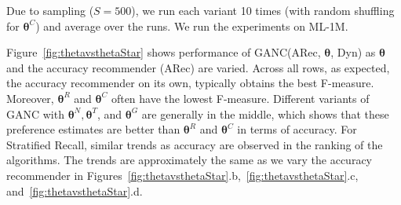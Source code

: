 Due to sampling ($S=500$), we run each variant 10 times (with random shuffling for  $\bm{\theta}^C$) and average over the runs.  We run the experiments on ML-1M.  %

Figure~\ref{fig:thetavsthetaStar} shows performance of GANC(ARec, $\bm{\theta}$, Dyn) as $\bm{\theta}$ and the accuracy recommender (ARec) are varied. Across all rows, as expected, the accuracy  recommender on its own, typically obtains the best F-measure.  Moreover, $\bm{\theta}^{R}$ and $\bm{\theta}^{C}$ often have the lowest F-measure. Different variants of GANC with $\bm{\theta}^{N},\bm{\theta}^{T}$, and $\bm{\theta}^{G}$ are generally in the middle, which shows that these  preference estimates are better than  $\bm{\theta}^{R}$ and $\bm{\theta}^{C}$ in terms of accuracy.  For Stratified Recall, similar trends as accuracy are observed in the ranking of the algorithms.   The trends are approximately the same as we vary  the accuracy recommender  in Figures~\ref{fig:thetavsthetaStar}.b,~\ref{fig:thetavsthetaStar}.c, and~\ref{fig:thetavsthetaStar}.d. 

 



